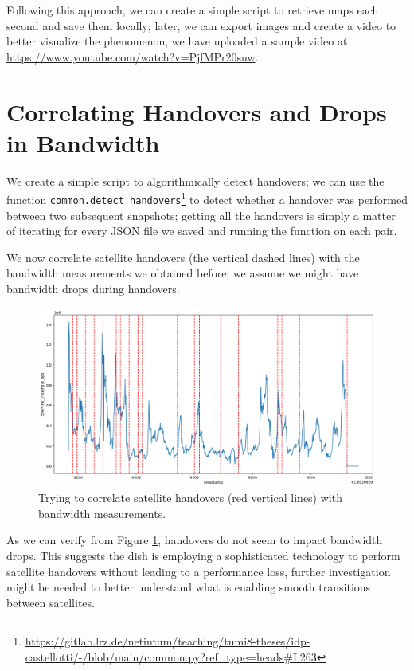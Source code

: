 \documentclass[IN,11pt,twoside,openright,idp,english]{tumthesis}
\begin{document}
Following this approach, we can create a simple script to retrieve maps each second and save them locally; later, we can export images and create a video to better visualize the phenomenon, we have uploaded a sample video at \url{https://www.youtube.com/watch?v=PjfMPr20suw}.

\section{Correlating Handovers and Drops in Bandwidth}
\label{sec:sat-hand-drop}

We create a simple script to algorithmically detect handovers; we can use the function \texttt{common.detect\_handovers}\footnote{\url{https://gitlab.lrz.de/netintum/teaching/tumi8-theses/idp-castellotti/-/blob/main/common.py?ref_type=heads\#L263}} to detect whether a handover was performed between two subsequent snapshots; getting all the handovers is simply a matter of iterating for every JSON file we saved and running the function on each pair.

We now correlate satellite handovers (the vertical dashed lines) with the bandwidth measurements we obtained before; we assume we might have bandwidth drops during handovers. 

\begin{figure}
    \centering
    \includegraphics[width=1\columnwidth]{img/correlation_handovers_bw.png}
    \caption{Trying to correlate satellite handovers (red vertical lines) with bandwidth measurements.}
    \label{fig:vis-correlation-handovers}
\end{figure}

As we can verify from Figure \ref{fig:vis-correlation-handovers}, handovers do not seem to impact bandwidth drops. This suggests the dish is employing a sophisticated technology to perform satellite handovers without leading to a performance loss, further investigation might be needed to better understand what is enabling smooth transitions between satellites.
\end{document}
